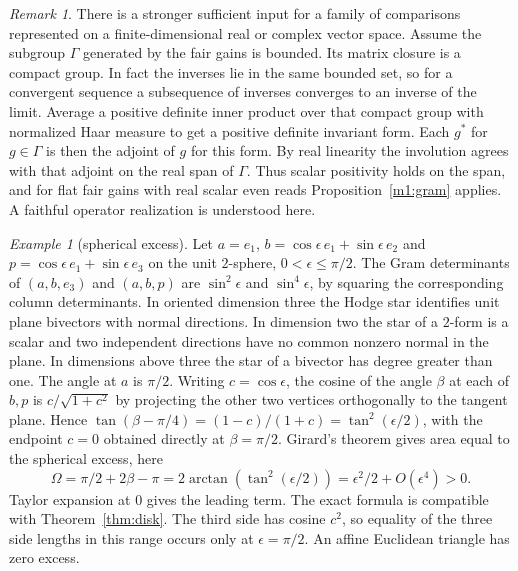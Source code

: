 \documentclass[11pt,reqno]{amsart}
\theoremstyle{definition}
\theoremstyle{remark}
\newtheorem{remark}[theorem]{Remark}
\newtheorem{example}[theorem]{Example}
\numberwithin{equation}{section}
\begin{document}
\begin{remark}\label{m1:unitarize}
There is a stronger sufficient input for a family of comparisons
represented on a finite-dimensional real or complex vector space.
Assume the subgroup \(\Gamma\) generated by the fair gains is bounded. Its matrix closure is a compact group. In fact the
inverses lie in the same bounded set, so for a convergent sequence
a subsequence of inverses converges to an inverse of the limit.
Average a positive definite inner product over that compact
group with normalized Haar measure to get a positive definite
invariant form. Each \(g^*\) for \(g\in\Gamma\) is then the
adjoint of \(g\) for this form. By real linearity the involution
agrees with that adjoint on the real span of \(\Gamma\).
Thus scalar positivity holds on the span, and for flat
fair gains with real scalar even reads Proposition~\ref{m1:gram}
applies. A faithful operator realization is understood here.
\end{remark}

\begin{example}[spherical excess]\label{m1:spherical}
Let \(a=e_1\), \(b=\cos\epsilon\,e_1+\sin\epsilon\,e_2\) and
\(p=\cos\epsilon\,e_1+\sin\epsilon\,e_3\) on the unit \(2\)-sphere,
\(0<\epsilon\le\pi/2\). The Gram determinants of
\((a,b,e_3)\) and \((a,b,p)\) are \(\sin^2\epsilon\) and
\(\sin^4\epsilon\), by squaring the corresponding column
determinants. In oriented dimension three the Hodge star
identifies unit plane bivectors with normal directions. In dimension two the star of a \(2\)-form is a
scalar and two independent directions have no common nonzero
normal in the plane. In dimensions above three the star of a
bivector has degree greater than one.
The angle at \(a\) is \(\pi/2\). Writing \(c=\cos\epsilon\),
the cosine of the angle \(\beta\) at each of \(b,p\) is
\(c/\sqrt{1+c^2}\) by projecting the other two vertices
orthogonally to the tangent plane. Hence
\(\tan(\beta-\pi/4)=(1-c)/(1+c)=\tan^2(\epsilon/2)\),
with the endpoint \(c=0\) obtained directly at \(\beta=\pi/2\).
Girard's theorem gives area equal to the spherical excess,
here
\[
 \Omega=\pi/2+2\beta-\pi=2\arctan(\tan^2(\epsilon/2))
        =\epsilon^2/2+O(\epsilon^4)>0 .
\]
Taylor expansion at \(0\) gives the leading term. The exact
formula is compatible with Theorem~\ref{thm:disk}.
The third side has cosine \(c^2\), so equality of the three
side lengths in this range occurs only at \(\epsilon=\pi/2\).
An affine Euclidean triangle has zero excess.
\end{example}
\end{document}

